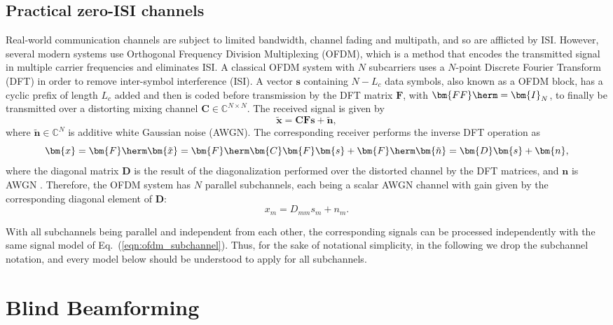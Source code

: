 \subsection{Practical zero-ISI channels}\label{ofdm}
Real-world communication channels are subject to limited bandwidth, channel fading and multipath, and so are afflicted by ISI. However, several modern systems use Orthogonal Frequency Division Multiplexing (OFDM), which is a method that encodes the transmitted signal in multiple carrier frequencies and eliminates ISI. 
A classical OFDM system with $N$ subcarriers uses a $N$-point Discrete Fourier Transform (DFT) in order to remove inter-symbol interference (ISI). A vector $\bm{s}$ containing $N-L_c$ data symbols, also known as a OFDM block, has a cyclic prefix of length $L_c$ added and then is coded before transmission by the DFT matrix $\bm{F}$, with $\bm{FF}\herm=\bm{I}_N$, to finally be transmitted over a distorting mixing channel $\bm{C}\in\mathbb{C}^{N\times N}$. The received signal is given by
\begin{equation}
\bm{\tilde{x}}=\bm{C}\bm{F}\bm{s} + \bm{\tilde{n}},
\end{equation}
where $\bm{\tilde{n}}\in\mathbb{C}^N$ is additive white Gaussian noise (AWGN). The corresponding receiver performs the inverse DFT operation as
\begin{equation}
\bm{x}=\bm{F}\herm\bm{\tilde{x}}=\bm{F}\herm\bm{C}\bm{F}\bm{s} + \bm{F}\herm\bm{\tilde{n}}=\bm{D}\bm{s}+\bm{n},
\end{equation}
where the diagonal matrix $\bm{D}$ is the result of the diagonalization performed over the distorted channel by the DFT matrices, and $\bm{n}$ is AWGN \cite{Ding2009book}. Therefore, the OFDM system has $N$ parallel subchannels, each being a scalar AWGN channel with gain given by the corresponding diagonal element of $\bm{D}$:
\begin{equation}
x_m=D_{mm}s_m+n_m. \label{eqn:ofdm_subchannel}
\end{equation} 

With all subchannels being parallel and independent from each other, the corresponding signals can be processed independently with the same signal model of Eq.~(\ref{eqn:ofdm_subchannel}). Thus, for the sake of notational simplicity, in the following we drop the subchannel notation, and every model below should be understood to apply for all subchannels.

\section{Blind Beamforming}\label{systemModel:beamforming}
